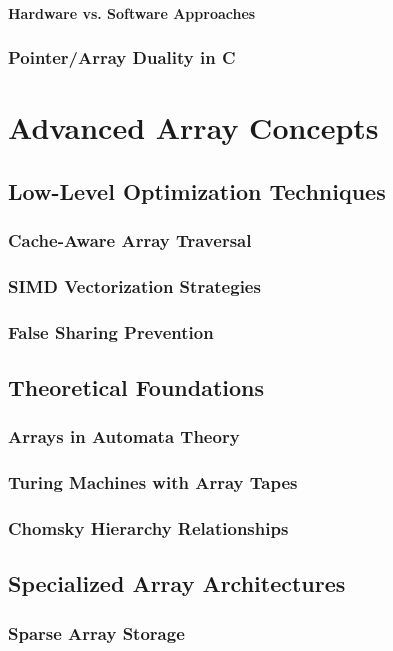 \documentclass[12pt, oneside]{book}
\begin{document}
	 \subsection{Hardware vs. Software Approaches}
	 \section{Pointer/Array Duality in C}
	 
	 \part{Advanced Array Concepts}
	 \chapter{Low-Level Optimization Techniques}
	 \section{Cache-Aware Array Traversal}
	 \section{SIMD Vectorization Strategies}
	 \section{False Sharing Prevention}
	 
	 \chapter{Theoretical Foundations}
	 \section{Arrays in Automata Theory}
	 \section{Turing Machines with Array Tapes}
	 \section{Chomsky Hierarchy Relationships}
	 
	 \chapter{Specialized Array Architectures}
	 \section{Sparse Array Storage}
\end{document}
